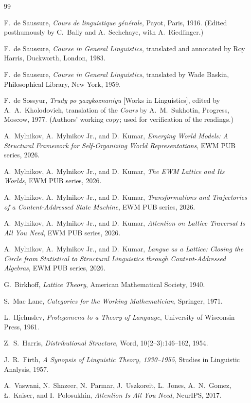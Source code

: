 \documentclass[11pt,a4paper]{article}
\theoremstyle{remark}
\begin{document}
\begin{thebibliography}{99}

 F.~de Saussure,
\textit{Cours de linguistique g\'en\'erale}, Payot, Paris, 1916.
(Edited posthumously by C.~Bally and A.~Sechehaye, with A.~Riedlinger.)

 F.~de Saussure,
\textit{Course in General Linguistics}, translated and annotated by
Roy Harris, Duckworth, London, 1983.

 F.~de Saussure,
\textit{Course in General Linguistics}, translated by Wade Baskin,
Philosophical Library, New York, 1959.

 F.~de Sossyur,
\textit{Trudy po yazykoznaniyu} [Works in Linguistics], edited by
A.~A.~Kholodovich, translation of the \textit{Cours} by A.~M.~Sukhotin,
Progress, Moscow, 1977.
(Authors' working copy; used for verification of the readings.)

 A.~Mylnikov, A.~Mylnikov Jr., and D.~Kumar,
\textit{Emerging World Models: A Structural Framework for Self-Organizing
World Representations}, EWM PUB series, 2026.

 A.~Mylnikov, A.~Mylnikov Jr., and D.~Kumar,
\textit{The EWM Lattice and Its Worlds}, EWM PUB series, 2026.

 A.~Mylnikov, A.~Mylnikov Jr., and D.~Kumar,
\textit{Transformations and Trajectories of a Content-Addressed State
Machine}, EWM PUB series, 2026.

 A.~Mylnikov, A.~Mylnikov Jr., and D.~Kumar,
\textit{Attention on Lattice Traversal Is All You Need}, EWM PUB series, 2026.

 A.~Mylnikov, A.~Mylnikov Jr., and D.~Kumar,
\textit{Langue as a Lattice: Closing the Circle from Statistical to
Structural Linguistics through Content-Addressed Algebras}, EWM PUB series,
2026.

 G.~Birkhoff,
\textit{Lattice Theory}, American Mathematical Society, 1940.

 S.~Mac Lane,
\textit{Categories for the Working Mathematician}, Springer, 1971.

 L.~Hjelmslev,
\textit{Prolegomena to a Theory of Language}, University of Wisconsin Press,
1961.

 Z.~S.~Harris,
\textit{Distributional Structure}, Word, 10(2--3):146--162, 1954.

 J.~R.~Firth,
\textit{A Synopsis of Linguistic Theory, 1930--1955}, Studies in Linguistic
Analysis, 1957.

 A.~Vaswani, N.~Shazeer, N.~Parmar, J.~Uszkoreit,
L.~Jones, A.~N.~Gomez, \L.~Kaiser, and I.~Polosukhin,
\textit{Attention Is All You Need}, NeurIPS, 2017.

\end{thebibliography}
\end{document}
